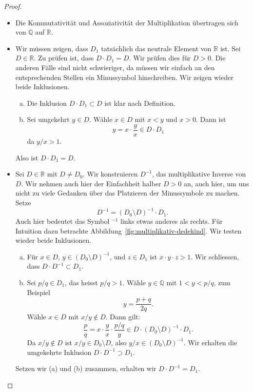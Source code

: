 \documentclass[../main.tex]{subfiles}
\begin{document}
\begin{proof}
  \leavevmode
  \begin{itemize}
    \item Die Kommutativität und Assoziativität der Multiplikation
      übertragen sich von $\mathbb Q$ auf $\mathbb R$.
    \item Wir müssen zeigen, dass $D_{1}$ tatsächlich das neutrale
      Element von $\mathbb R$ ist.
      Sei $D \in \mathbb R$. Zu prüfen ist, dass $D \cdot D_{1} = D$.
      Wir prüfen dies für $D > 0$. Die anderen Fälle sind nicht
      schwieriger, da müssen wir einfach an den entsprechenden Stellen
      ein Minussymbol hinschreiben.
      Wir zeigen wieder beide Inklusionen.
      \begin{enumerate}[(a)]
        \item Die Inklusion $D \cdot D_{1} \subset D$ ist klar nach Definition.
        \item Sei umgekehrt $y \in D$. Wähle $x \in D$ mit $x < y$ und $x > 0$.
          Dann ist \[y = x \cdot \frac{y}{x} \in D \cdot D_{1}\] da $y/x > 1$.
      \end{enumerate}
      Also ist $D \cdot D_{1} = D$.
    \item
      Sei $D \in \mathbb R$ mit $D \neq D_{0}$.
      Wir konstruieren $D^{-1}$, das multiplikative Inverse von $D$.
      Wir nehmen auch hier der Einfachheit halber $D > 0$ an,
      auch hier, um uns nicht zu viele Gedanken über das Platzieren
      der Minussymbole zu machen. Setze
      \[D^{-1} = {(D_{0} \setminus D)}^{-1} \cdot D_{1}.\]
      Auch hier bedeutet das Symbol ${}^{-1}$ links etwas anderes als rechts.
      Für Intuition dazu betrachte Abbildung~\ref{fig:multiplikativ-dedekind}.
      Wir testen wieder beide Inklusionen.
      \begin{enumerate}[(a)]
        \item Für $x \in D$, $y \in {(D_{0} \setminus D)}^{-1}$, und
          $z \in D_{1}$ ist $x \cdot y \cdot z > 1$.
          Wir schliessen, dass $D \cdot D^{-1} \subset D_{1}$.
        \item Sei $p/q \in D_{1}$, das heisst $p/q > 1$.
          Wähle $y \in \mathbb Q$ mit $1 < y < p/q$, zum Beispiel
          \[y = \frac{p + q}{2q}.\]
          Wähle $x \in D$ mit $x/y \notin D$. Dann gilt:
          \[\frac{p}{q} = x \cdot \frac{y}{x} \cdot
            \frac{p/q}{y}\in D \cdot
          {(D_{0} \setminus D)}^{-1} \cdot D_{1}.\]
          Da $x/y \notin D$ ist $x / y \in D_{0} \setminus D$,
          also $y/x \in {(D_{0} \setminus D)}^{-1}$.
          Wir erhalten die umgekehrte Inklusion $D \cdot D^{-1} \supset D_{1}$.
      \end{enumerate}
      Setzen wir (a) und (b) zusammen, erhalten wir $D \cdot D^{-1} = D_{1}$.
      \qedhere
  \end{itemize}
\end{proof}
\end{document}
